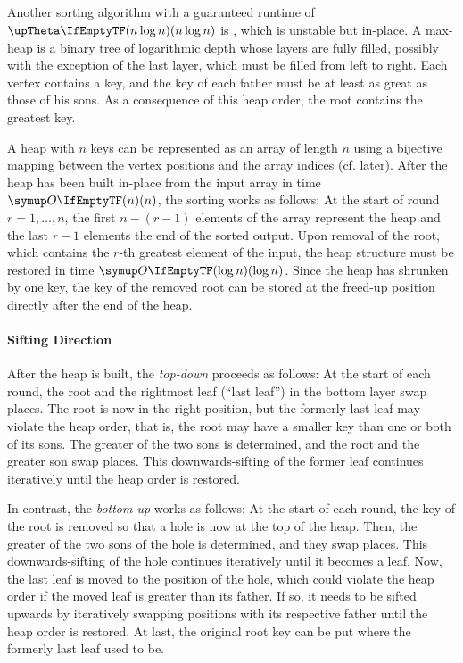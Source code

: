 \subsection{\texorpdfstring{\HS{}}{HeapSort}}
\label{subsec:tasklet:heap}

Another sorting algorithm with a guaranteed runtime of \(\bigtheta{n \log n}\) is \HS{}, which is unstable but in-place.
A max-heap is a binary tree of logarithmic depth whose layers are fully filled, possibly with the exception of the last layer, which must be filled from left to right.
Each vertex contains a key, and the key of each father must be at least as great as those of his sons.
As a consequence of this heap order, the root contains the greatest key.

A heap with \(n\) keys can be represented as an array of length \(n\) using a bijective mapping between the vertex positions and the array indices (cf. later).
After the heap has been built in-place from the input array in time \(\bigoh{n}\), the sorting works as follows:
At the start of round \(r = 1, \dots, n\), the first \(n - (r - 1)\) elements of the array represent the heap and the last \(r - 1\) elements the end of the sorted output.
Upon removal of the root, which contains the \(r\)-th greatest element of the input, the heap structure must be restored in time \(\bigoh{\log n}\).
Since the heap has shrunken by one key, the key of the removed root can be stored at the freed-up position directly after the end of the heap.

\paragraph{Sifting Direction}
After the heap is built, the \emph{top-down} \HS{} proceeds as follows:
At the start of each round, the root and the rightmost leaf (\enquote{last leaf}) in the bottom layer swap places.
The root is now in the right position, but the formerly last leaf may violate the heap order, that is, the root may have a smaller key than one or both of its sons.
The greater of the two sons is determined, and the root and the greater son swap places.
This downwards-sifting of the former leaf continues iteratively until the heap order is restored.

In contrast, the \emph{bottom-up} \HS{} \cite{wegener1993heapsort} works as follows:
At the start of each round, the key of the root is removed so that a hole is now at the top of the heap.
Then, the greater of the two sons of the hole is determined, and they swap places.
This downwards-sifting of the hole continues iteratively until it becomes a leaf.
Now, the last leaf is moved to the position of the hole, which could violate the heap order if the moved leaf is greater than its father.
If so, it needs to be sifted upwards by iteratively swapping positions with its respective father until the heap order is restored.
At last, the original root key can be put where the formerly last leaf used to be.

